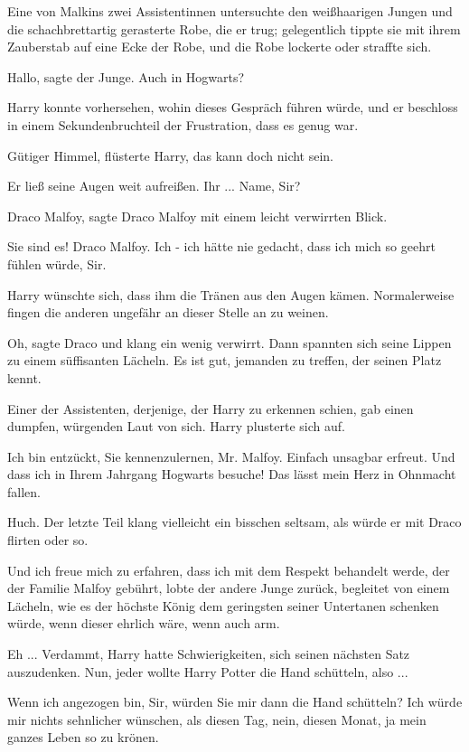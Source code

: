 Eine von Malkins zwei Assistentinnen untersuchte den weißhaarigen Jungen und die
schachbrettartig gerasterte Robe, die er trug; gelegentlich tippte sie mit ihrem
Zauberstab auf eine Ecke der Robe, und die Robe lockerte oder straffte sich.

\glqq{}Hallo\grqq{}, sagte der Junge. \glqq{}Auch in Hogwarts?\grqq{}

Harry konnte vorhersehen, wohin dieses Gespräch führen würde, und er beschloss
in einem Sekundenbruchteil der Frustration, dass es genug war.

\glqq{}Gütiger Himmel\grqq{}, flüsterte Harry, \glqq{}das kann doch nicht
sein.\grqq{}

Er ließ seine Augen weit aufreißen. \glqq{}Ihr ... Name, Sir?\grqq{}

\glqq{}Draco Malfoy\grqq{}, sagte Draco Malfoy mit einem leicht verwirrten Blick.

\glqq{}Sie sind es! Draco Malfoy. Ich - ich hätte nie gedacht, dass ich mich so
geehrt fühlen würde, Sir.\grqq{}

Harry wünschte sich, dass ihm die Tränen aus den Augen kämen. Normalerweise
fingen die anderen ungefähr an dieser Stelle an zu weinen.

\glqq{}Oh\grqq{}, sagte Draco und klang ein wenig verwirrt. Dann spannten sich
seine Lippen zu einem süffisanten Lächeln. \glqq{}Es ist gut, jemanden zu
treffen, der seinen Platz kennt.\grqq{}

Einer der Assistenten, derjenige, der Harry zu erkennen schien, gab einen
dumpfen, würgenden Laut von sich. Harry plusterte sich auf.

\glqq{}Ich bin entzückt, Sie kennenzulernen, Mr. Malfoy. Einfach unsagbar
erfreut. Und dass ich in Ihrem Jahrgang Hogwarts besuche! Das lässt mein Herz in
Ohnmacht fallen.\grqq{}

Huch. Der letzte Teil klang vielleicht ein bisschen seltsam, als würde er mit
Draco flirten oder so.

\glqq{}Und ich freue mich zu erfahren, dass ich mit dem Respekt behandelt werde,
der der Familie Malfoy gebührt\grqq{}, lobte der andere Junge zurück, begleitet
von einem Lächeln, wie es der höchste König dem geringsten seiner Untertanen
schenken würde, wenn dieser ehrlich wäre, wenn auch arm.

Eh ... Verdammt, Harry hatte Schwierigkeiten, sich seinen nächsten Satz
auszudenken. Nun, jeder wollte Harry Potter die Hand schütteln, also ...

\glqq{}Wenn ich angezogen bin, Sir, würden Sie mir dann die Hand schütteln? Ich
würde mir nichts sehnlicher wünschen, als diesen Tag, nein, diesen Monat, ja
mein ganzes Leben so zu krönen.\grqq{}

